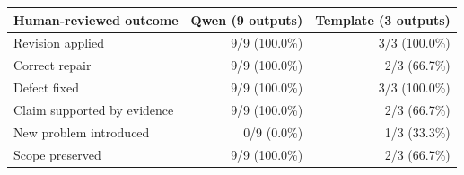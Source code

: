 \begin{tabular}{lrr}
\toprule
Human-reviewed outcome & Qwen (9 outputs) & Template (3 outputs) \\
\midrule
Revision applied & 9/9 (100.0\%) & 3/3 (100.0\%) \\
Correct repair & 9/9 (100.0\%) & 2/3 (66.7\%) \\
Defect fixed & 9/9 (100.0\%) & 3/3 (100.0\%) \\
Claim supported by evidence & 9/9 (100.0\%) & 2/3 (66.7\%) \\
New problem introduced & 0/9 (0.0\%) & 1/3 (33.3\%) \\
Scope preserved & 9/9 (100.0\%) & 2/3 (66.7\%) \\
\bottomrule
\end{tabular}
